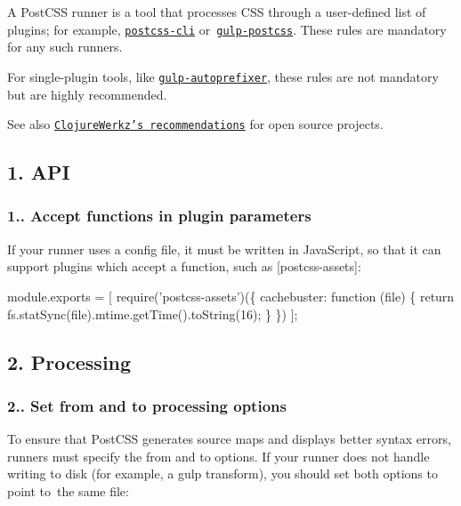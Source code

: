 A Post\+C\+SS runner is a tool that processes C\+SS through a user-\/defined list of plugins; for example, \href{https://github.com/postcss/postcss-cli}{\tt {\ttfamily postcss-\/cli}} or \href{https://github.com/w0rm/gulp-postcss}{\tt {\ttfamily gulp‑postcss}}. These rules are mandatory for any such runners.

For single-\/plugin tools, like \href{https://github.com/sindresorhus/gulp-autoprefixer}{\tt {\ttfamily gulp-\/autoprefixer}}, these rules are not mandatory but are highly recommended.

See also \href{http://blog.clojurewerkz.org/blog/2013/04/20/how-to-make-your-open-source-project-really-awesome/}{\tt Clojure\+Werkz’s recommendations} for open source projects.

\subsection*{1. A\+PI}

\subsubsection*{1.. Accept functions in plugin parameters}

If your runner uses a config file, it must be written in Java\+Script, so that it can support plugins which accept a function, such as \mbox{[}{\ttfamily postcss-\/assets}\mbox{]}\+:


\begin{DoxyCode}
module.exports = [
    require('postcss-assets')(\{
        cachebuster: function (file) \{
            return fs.statSync(file).mtime.getTime().toString(16);
        \}
    \})
];
\end{DoxyCode}


\subsection*{2. Processing}

\subsubsection*{2.. Set {\ttfamily from} and {\ttfamily to} processing options}

To ensure that Post\+C\+SS generates source maps and displays better syntax errors, runners must specify the {\ttfamily from} and {\ttfamily to} options. If your runner does not handle writing to disk (for example, a gulp transform), you should set both options to point to the same file\+:


